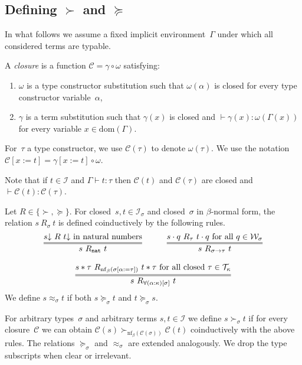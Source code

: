 \documentclass[runningheads,a4paper]{llncs}
\newcommand{\Iterms}{\mathcal{I}}
\newcommand{\World}{\mathcal{W}}
\newcommand{\cl}{\mathcal{C}}
\newcommand{\dom}{\mathrm{dom}}
\newcommand{\nf}{\mathrm{nf}}
\newcommand{\arrtype}{\rightarrow}
\newcommand{\app}[2]{#1 \cdot #2}
\newcommand{\tapp}[2]{#1 * #2}
\newcommand{\subst}[2]{#1:=#2}
\newcommand{\Tc}{\mathcal{T}}
\newcommand{\nat}{\mathtt{nat}}
\newcommand{\da}{\mathord{\downarrow}}
\newcommand{\proves}{\vdash}
\begin{document}
\subsection{Defining $\succ$ and $\succeq$}

In what follows we assume a fixed implicit environment~$\Gamma$ under
which all considered terms are typable.

\begin{definition}\label{def_closure}\normalfont
  A \emph{closure} is a function $\cl = \gamma \circ \omega$
  satisfying:
  \begin{enumerate}
  \item $\omega$ is a type constructor substitution such that
    $\omega(\alpha)$ is closed for every type constructor
    variable~$\alpha$,
  \item $\gamma$ is a term substitution such that $\gamma(x)$ is
    closed and $\proves \gamma(x) : \omega(\Gamma(x))$ for every
    variable $x \in \dom(\Gamma)$.
  \end{enumerate}
  For~$\tau$ a type constructor, we use $\cl(\tau)$ to denote
  $\omega(\tau)$. We use the notation $\cl[\subst{x}{t}] =
  \gamma[\subst{x}{t}] \circ \omega$.
\end{definition}

Note that if $t \in \Iterms$ and $\Gamma \proves t : \tau$ then
$\cl(t)$ and $\cl(\tau)$ are closed and $\proves \cl(t) : \cl(\tau)$.

\begin{definition}\label{def:succ}\normalfont
  Let $R \in \{ \succ,\succeq \}$. For closed~$s,t\in\Iterms_\sigma$
  and closed~$\sigma$ in $\beta$-normal form, the relation
  $s\ R_{\sigma}\ t$ is defined coinductively by the following rules.
  \[
  \begin{array}{cc}
    \infer={s\ R_\nat\ t}{s\da\ R\ t\da \text{ in natural numbers}} \quad&\quad
    \infer={s\ R_{\sigma\arrtype\tau}\ t}{\app{s}{q}\ R_{\tau}\ \app{t}{q} \text{ for all } q \in \World_\sigma} \\ \\
    \multicolumn{2}{c}{
    \infer={s\ R_{\forall(\alpha:\kappa)[\sigma]}\ t}{\tapp{s}{\tau}\ R_{\nf_\beta(\sigma[\subst{\alpha}{\tau}])}\ \tapp{t}{\tau} \text{ for all closed } \tau \in \Tc_{\kappa}}}
  \end{array}
  \]
  We define $s \approx_\sigma t$ if both $s \succeq_\sigma t$ and $t
  \succeq_\sigma s$.

  For arbitrary types~$\sigma$ and arbitrary terms $s,t \in \Iterms$
  we define $s \succ_\sigma t$ if for every closure~$\cl$ we can
  obtain $\cl(s) \succ_{\nf_\beta(\cl(\sigma))} \cl(t)$ coinductively
  with the above rules. The relations $\succeq_\sigma$ and
  $\approx_\sigma$ are extended analogously. We drop the type
  subscripts when clear or irrelevant.
\end{definition}
\end{document}
